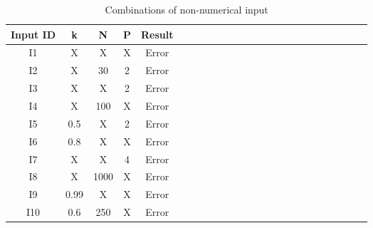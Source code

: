\documentclass[12pt, titlepage]{article}
\begin{document}
\begin{table}[h!]
	\centering
	\begin{tabular}{|c|c|c|c|c|c|c|c|c|c|c|c|c|c|c|c|c|c|c|c|c|c|c|c|}
		\hline        
		Input ID& k& N & P & Result \\
		\hline
		I1    &X &X &X & Error \\ \hline
		I2    &X &30 &2 & Error\\ \hline 
		I3    &X &X &2 &Error \\ \hline 
		I4     &X &100 &X &Error \\ \hline
		I5     &0.5 &X & 2& Error\\ \hline
		I6    &0.8 &X &X & Error  \\ \hline
		I7      &X &X &4 & Error \\ \hline
		I8     &X &1000 &X & Error \\ \hline
		I9     &0.99 &X &X & Error \\ \hline 
		I10    &0.6 &250 &X & Error \\ 
		\hline
	\end{tabular}\\
	\caption{Combinations of non-numerical input}
	\label{Table:D_11}
\end{table} 
\end{document}
